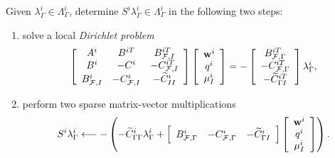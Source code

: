 \begin{algorithm}
\label{alg:S-mult} Given $\lambda_{\Gamma}^{i}\in\Lambda_{\Gamma}^{i}$,
determine $S^{i}\lambda_{\Gamma}^{i}\in\Lambda_{\Gamma}^{i}$ in the following
two steps:

\begin{enumerate}
\item solve a local \emph{Dirichlet problem}
\begin{equation}
\left[
\begin{array}
[c]{ccc}%
A^{i} & B^{iT} & B_{\mathcal{F},I}^{iT}\\
B^{i} & -C^{i} & -C_{\mathcal{F},I}^{iT}\\
B_{\mathcal{F},I}^{i} & -C_{\mathcal{F},I}^{i} & -\widetilde{C}_{II}^{i}%
\end{array}
\right]  \left[
\begin{array}
[c]{c}%
\mathbf{w}^{i}\\
q^{i}\\
\mu_{I}^{i}%
\end{array}
\right]  =-\left[
\begin{array}
[c]{c}%
B_{\mathcal{F},\Gamma}^{iT}\\
-C_{\mathcal{F},\Gamma}^{iT}\\
-\widetilde{C}_{{\Gamma}I}^{iT}%
\end{array}
\right]  \lambda_{\Gamma}^{i},
\label{eq:discrete-dirichlet-problem-substructure}%
\end{equation}


\item perform two sparse matrix-vector multiplications
\begin{equation}
S^{i}\lambda_{\Gamma}^{i}\longleftarrow - \left( - \widetilde{C}_{{\Gamma}{\Gamma}}%
^{i}\lambda_{\Gamma}^{i} + \left[
\begin{array}
[c]{ccc}%
B_{\mathcal{F},\Gamma}^{i} & -C_{\mathcal{F},\Gamma}^{i} & -\widetilde{C}%
_{{\Gamma}I}^{i}%
\end{array}
\right]  \left[
\begin{array}
[c]{c}%
\mathbf{w}^{i}\\
q^{i}\\
\mu_{I}^{i}%
\end{array}
\right] 
\right). 
\label{eq:substructure-schur-multiple}%
\end{equation}

\end{enumerate}
\end{algorithm}

